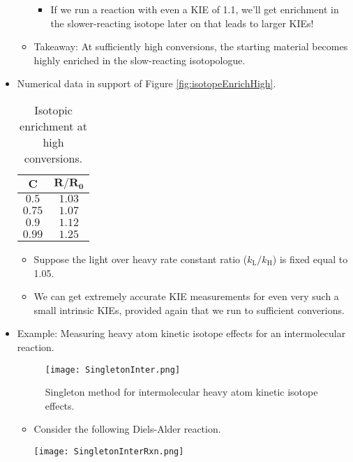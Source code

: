 \documentclass[../notes.tex]{subfiles}
\begin{document}
\begin{itemize}
\begin{itemize}
\begin{itemize}
            \item If we run a reaction with even a KIE of 1.1, we'll get enrichment in the slower-reacting isotope later on that leads to larger KIEs!
        \end{itemize}
        \item Takeaway: At sufficiently high conversions, the starting material becomes highly enriched in the slow-reacting isotopologue.
    \end{itemize}
    \item Numerical data in support of Figure \ref{fig:isotopeEnrichHigh}.
    \begin{table}[h!]
        \centering
        \small
        \renewcommand{\arraystretch}{1.2}
        \begin{tabular}{cc}
            $\bm{C}$ & $\bm{R/R_0}$\\
            \hline
            $0.5$  & $1.03$\\
            $0.75$ & $1.07$\\
            $0.9$  & $1.12$\\
            $0.99$ & $1.25$\\
        \end{tabular}
        \caption{Isotopic enrichment at high conversions.}
        \label{tab:isotopeEnrichHigh}
    \end{table}
    \begin{itemize}
        \item Suppose the light over heavy rate constant ratio ($k_\text{L}/k_\text{H}$) is fixed equal to 1.05.
        \item We can get extremely accurate KIE measurements for even very such a small intrinsic KIEs, provided again that we run to sufficient converions.
    \end{itemize}
    \item Example: Measuring heavy atom kinetic isotope effects for an intermolecular reaction.
    \begin{figure}[H]
        \centering
        \texttt{[image: SingletonInter.png]}
        \caption{Singleton method for intermolecular heavy atom kinetic isotope effects.}
        \label{fig:SingletonInter}
    \end{figure}
    \begin{itemize}
        \item Consider the following Diels-Alder reaction.
        \begin{center}
            \texttt{[image: SingletonInterRxn.png]}

\end{center}
\end{itemize}
\end{itemize}
\end{document}
